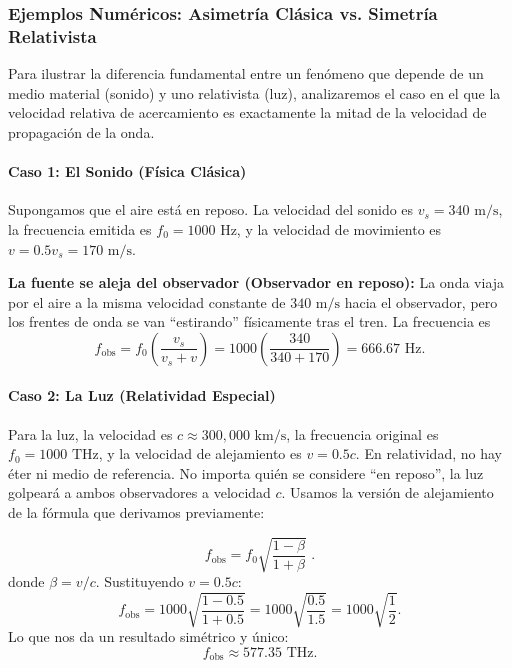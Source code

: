 \documentclass[11pt,a4paper]{book}
\begin{document}
\subsubsection*{Ejemplos Numéricos: Asimetría Clásica vs. Simetría Relativista}

Para ilustrar la diferencia fundamental entre un fenómeno que depende de un medio material (sonido) y uno relativista (luz), analizaremos el caso en el que la velocidad relativa de acercamiento es exactamente la mitad de la velocidad de propagación de la onda.

\paragraph{Caso 1: El Sonido (Física Clásica)}
Supongamos que el aire está en reposo. La velocidad del sonido es $v_s = 340 \text{ m/s}$, la frecuencia emitida es $f_0 = 1000 \text{ Hz}$, y la velocidad de movimiento es $v = 0.5 v_s = 170 \text{ m/s}$.

    
    \textbf{La fuente se aleja del observador (Observador en reposo):} La onda viaja por el aire a la misma velocidad constante de $340 \text{ m/s}$ hacia el observador, pero los frentes de onda se van ``estirando'' físicamente tras el tren. La frecuencia es
    \begin{equation}
        f_{\text{obs}} = f_0 \left( \frac{v_s}{v_s + v} \right) = 1000 \left( \frac{340}{340 + 170} \right) = 666.67 \text{ Hz}.
    \end{equation}


\paragraph{Caso 2: La Luz (Relatividad Especial)}
Para la luz, la velocidad es $c \approx 300,000 \text{ km/s}$, la frecuencia original es $f_0 = 1000 \text{ THz}$, y la velocidad de alejamiento es $v = 0.5 c$.
En relatividad, no hay éter ni medio de referencia. No importa quién se considere ``en reposo'', la luz golpeará a ambos observadores a velocidad $c$. Usamos la versión de alejamiento de la fórmula que derivamos previamente:

\begin{equation}
    f_{\text{obs}} = f_0 \sqrt{\frac{1 - \beta}{1 + \beta}}\,\,.
\end{equation}
donde $\beta=v/c$.
Sustituyendo $v = 0.5 c$:
\begin{equation}
    f_{\text{obs}} = 1000 \sqrt{\frac{1 - 0.5}{1 + 0.5}} = 1000 \sqrt{\frac{0.5}{1.5}} = 1000 \sqrt{\frac{1}{2}}.
\end{equation}
Lo que nos da un resultado simétrico y único:
\begin{equation}
    f_{\text{obs}} \approx 577.35 \text{ THz}.
\end{equation}
\end{document}
